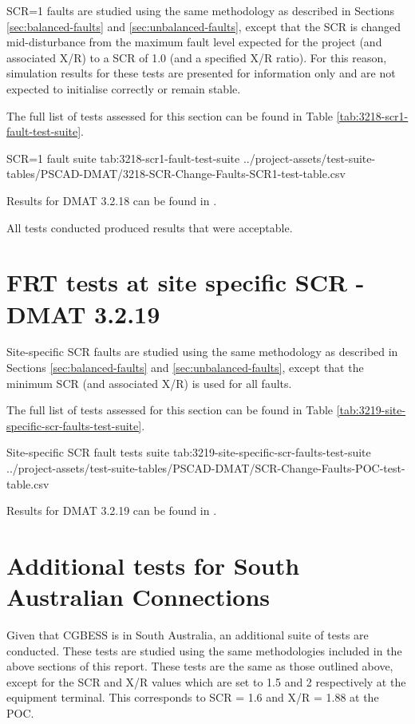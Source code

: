 \documentclass{../grid-link-report}
\newcommand{\projectassetsdir}{../project-assets}
\begin{document}
	SCR=1 faults are studied using the same methodology as described in Sections \ref{sec:balanced-faults} and \ref{sec:unbalanced-faults}, except that the SCR is changed mid-disturbance from the maximum fault level expected for the project (and associated X/R) to a SCR of 1.0 (and a specified X/R ratio). For this reason, simulation results for these tests are presented for information only and are not expected to initialise correctly or remain stable.
	
	The full list of tests assessed for this section can be found in Table \ref{tab:3218-scr1-fault-test-suite}.
	
	{
		\fontsize{5}{7}\selectfont
		\autoscaledlongtable
		{SCR=1 fault suite}
		{tab:3218-scr1-fault-test-suite}
		{\projectassetsdir/test-suite-tables/PSCAD-DMAT/3218-SCR-Change-Faults-SCR1-test-table.csv}
	}
	
	Results for DMAT 3.2.18 can be found in .
	
	All tests conducted produced results that were acceptable.
	
	
	\section{FRT tests at site specific SCR - DMAT 3.2.19}		
	
	
	Site-specific SCR faults are studied using the same methodology as described in Sections \ref{sec:balanced-faults} and \ref{sec:unbalanced-faults}, except that the minimum SCR (and associated X/R) is used for all faults.
	
	The full list of tests assessed for this section can be found in Table \ref{tab:3219-site-specific-scr-faults-test-suite}.
	
	{
		\fontsize{4}{6}\selectfont
		\autoscaledlongtable
		{Site-specific SCR fault tests suite}
		{tab:3219-site-specific-scr-faults-test-suite}
		{\projectassetsdir/test-suite-tables/PSCAD-DMAT/SCR-Change-Faults-POC-test-table.csv}
	}
	
	Results for DMAT 3.2.19 can be found in .
	
	\section{Additional tests for South Australian Connections}
	
	Given that \ac{CGBESS} is in South Australia, an additional suite of tests are conducted. These tests are studied using the same methodologies included in the above sections of this report. These tests are the same as those outlined above, except for the \ac{SCR} and X/R values which are set to 1.5 and 2 respectively at the equipment terminal. This corresponds to SCR = 1.6 and X/R = 1.88 at the POC. 
	
\end{document}
